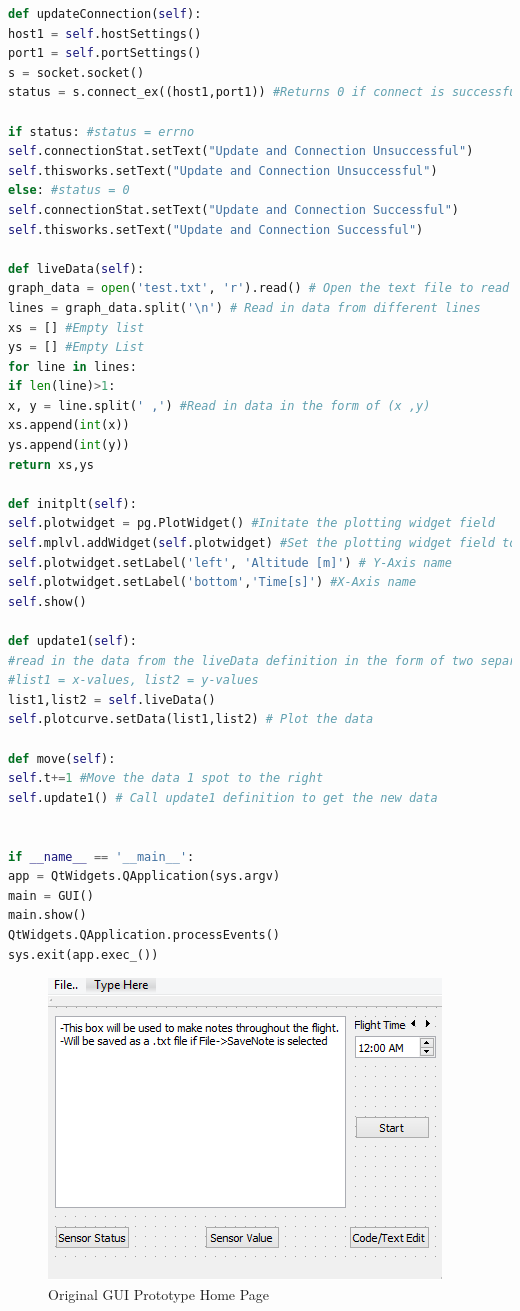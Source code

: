 \begin{lstlisting}[language=Python,caption={GUI.py},label={lst:GUI.py}]
def updateConnection(self):
host1 = self.hostSettings()
port1 = self.portSettings()
s = socket.socket()
status = s.connect_ex((host1,port1)) #Returns 0 if connect is successful, returns errno if not

if status: #status = errno
self.connectionStat.setText("Update and Connection Unsuccessful")
self.thisworks.setText("Update and Connection Unsuccessful")
else: #status = 0
self.connectionStat.setText("Update and Connection Successful")
self.thisworks.setText("Update and Connection Successful")

def liveData(self):
graph_data = open('test.txt', 'r').read() # Open the text file to read in data
lines = graph_data.split('\n') # Read in data from different lines
xs = [] #Empty list
ys = [] #Empty List
for line in lines:
if len(line)>1:
x, y = line.split(' ,') #Read in data in the form of (x ,y)
xs.append(int(x))
ys.append(int(y))
return xs,ys

def initplt(self):
self.plotwidget = pg.PlotWidget() #Initate the plotting widget field
self.mplvl.addWidget(self.plotwidget) #Set the plotting widget field to populate the QVBoxLayout widget field
self.plotwidget.setLabel('left', 'Altitude [m]') # Y-Axis name
self.plotwidget.setLabel('bottom','Time[s]') #X-Axis name
self.show()

def update1(self):
#read in the data from the liveData definition in the form of two separate lists. 
#list1 = x-values, list2 = y-values
list1,list2 = self.liveData()
self.plotcurve.setData(list1,list2) # Plot the data

def move(self):
self.t+=1 #Move the data 1 spot to the right
self.update1() # Call update1 definition to get the new data


if __name__ == '__main__':
app = QtWidgets.QApplication(sys.argv)
main = GUI()
main.show()
QtWidgets.QApplication.processEvents()
sys.exit(app.exec_())
\end{lstlisting}
\begin{figure}[H]
	\label{fig:OGUIHomePage}
	\includegraphics[width=\linewidth]{OLDGUI1.png}
	\caption{Original GUI Prototype Home Page}
\end{figure}
